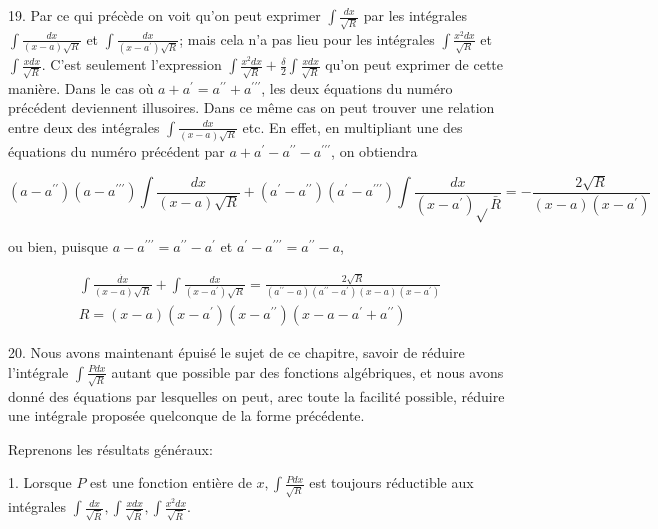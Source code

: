 \documentclass{article}
\begin{document}
19. Par ce qui précède on voit qu'on peut exprimer \(\int \frac{d x}{\sqrt{R}}\) par les intégrales \(\int \frac{d x}{(x-a) \sqrt{R}}\) et \(\int \frac{d x}{\left(x-a^{\prime}\right) \sqrt{R}}\); mais cela n'a pas lieu pour les intégrales \(\int \frac{x^{2} d x}{\sqrt{R}}\) et \(\int \frac{x d x}{\sqrt{R}}\). C'est seulement l'expression \(\int \frac{x^{2} d x}{\sqrt{R}}+\frac{\delta}{2} \int \frac{x d x}{\sqrt{R}}\) qu'on peut exprimer de cette manière. Dans le cas où \(a+a^{\prime}=a^{\prime \prime}+a^{\prime \prime \prime}\), les deux équations du numéro précédent deviennent illusoires. Dans ce même cas on peut trouver une relation entre deux des intégrales \(\int \frac{d x}{(x-a) \sqrt{R}}\) etc. En effet, en multipliant une des équations du numéro précédent par \(a+a^{\prime}-a^{\prime \prime}-a^{\prime \prime \prime}\), on obtiendra

\[
\left(a-a^{\prime \prime}\right)\left(a-a^{\prime \prime \prime}\right) \int \frac{d x}{(x-a) \sqrt{R}}+\left(a^{\prime}-a^{\prime \prime}\right)\left(a^{\prime}-a^{\prime \prime \prime}\right) \int \frac{d x}{\left(x-a^{\prime}\right) \sqrt{ } \bar{R}}=-\frac{2 \sqrt{R}}{(x-a)\left(x-a^{\prime}\right)}
\]

ou bien, puisque \(a-a^{\prime \prime \prime}=a^{\prime \prime}-a^{\prime}\) et \(a^{\prime}-a^{\prime \prime \prime}=a^{\prime \prime}-a\),

\[
\begin{gathered}
\int \frac{\dot{d x}}{(x-a) \sqrt{R}}+\int \frac{d x}{\left(x-a^{\prime}\right) \sqrt{R}}=\frac{2 \sqrt{R}}{\left(a^{\prime \prime}-a\right)\left(a^{\prime \prime}-a^{\prime}\right)(x-a)\left(x-a^{\prime}\right)} \\
R=(x-a)\left(x-a^{\prime}\right)\left(x-a^{\prime \prime}\right)\left(x-a-a^{\prime}+a^{\prime \prime}\right)
\end{gathered}
\]

20. Nous avons maintenant épuisé le sujet de ce chapitre, savoir de réduire l'intégrale \(\int \frac{P d x}{\sqrt{R}}\) autant que possible par des fonctions algébriques, et nous avons donné des équations par lesquelles on peut, arec toute la
facilité possible, réduire une intégrale proposée quelconque de la forme précédente.

Reprenons les résultats généraux:

1. Lorsque \(P\) est une fonction entière de \(x, \int \frac{P d x}{\sqrt{R}}\) est toujours réductible aux intégrales \(\int \frac{d x}{\sqrt{\bar{R}}}, \int \frac{x d x}{\sqrt{\bar{R}}}, \int \frac{x^{2} d x}{\sqrt{\bar{R}}}\).
\end{document}
